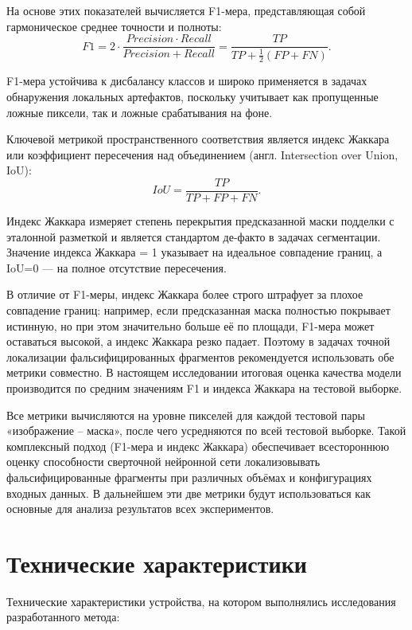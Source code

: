 На основе этих показателей вычисляется F1-мера, представляющая собой гармоническое среднее точности и полноты:
\begin{equation}
    F1 = 2 \cdot \frac{Precision \cdot Recall}{Precision + Recall} = \frac{TP}{TP + \frac{1}{2} (FP + FN)}.
\end{equation}

F1-мера устойчива к дисбалансу классов и широко применяется в задачах обнаружения локальных артефактов, поскольку учитывает как пропущенные ложные пиксели, так и ложные срабатывания на фоне. 

Ключевой метрикой пространственного соответствия является индекс Жаккара или коэффициент пересечения над объединением (англ. Intersection over Union, IoU):
\begin{equation}
    IoU = \frac{TP}{TP+FP+FN}.
\end{equation}

Индекс Жаккара измеряет степень перекрытия предсказанной маски подделки с эталонной разметкой и является стандартом де-факто в задачах сегментации. Значение индекса Жаккара = 1 указывает на идеальное совпадение границ, а IoU=0 --- на полное отсутствие пересечения.

В отличие от F1-меры, индекс Жаккара более строго штрафует за плохое совпадение границ: например, если предсказанная маска полностью покрывает истинную, но при этом значительно больше её по площади, F1-мера может оставаться высокой, а индекс Жаккара резко падает. Поэтому в задачах точной локализации фальсифицированных фрагментов рекомендуется использовать обе метрики совместно. В настоящем исследовании итоговая оценка качества модели производится по средним значениям F1 и индекса Жаккара на тестовой выборке.

Все метрики вычисляются на уровне пикселей для каждой тестовой пары «изображение -- маска», после чего усредняются по всей тестовой выборке. Такой комплексный подход (F1-мера и индекс Жаккара) обеспечивает всестороннюю оценку способности сверточной нейронной сети локализовывать фальсифицированные фрагменты при различных объёмах и конфигурациях входных данных. В дальнейшем эти две метрики будут использоваться как основные для анализа результатов всех экспериментов.

\section{Технические характеристики}

Технические характеристики устройства, на котором выполнялись исследования разработанного метода:

